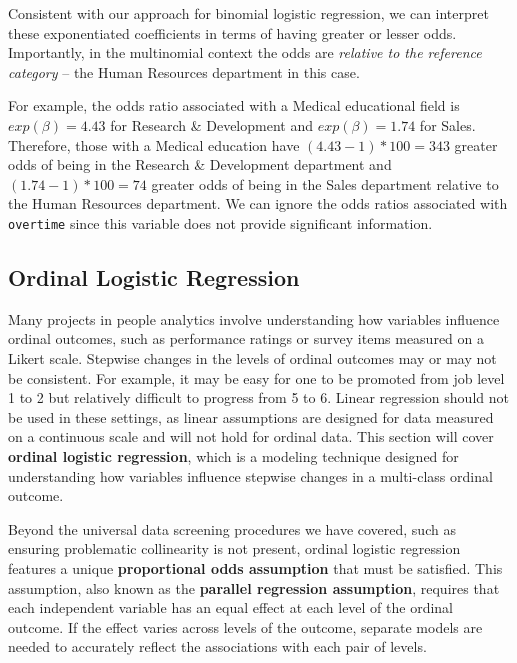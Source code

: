 \documentclass[
]{book}
\begin{document}
Consistent with our approach for binomial logistic regression, we can interpret these exponentiated coefficients in terms of having greater or lesser odds. Importantly, in the multinomial context the odds are \emph{relative to the reference category} -- the Human Resources department in this case.

For example, the odds ratio associated with a Medical educational field is \(exp(\beta) = 4.43\) for Research \& Development and \(exp(\beta) = 1.74\) for Sales. Therefore, those with a Medical education have \((4.43 - 1) * 100 = 343%
\) greater odds of being in the Research \& Development department and \((1.74 - 1) * 100 = 74%
\) greater odds of being in the Sales department relative to the Human Resources department. We can ignore the odds ratios associated with \texttt{overtime} since this variable does not provide significant information.

\hypertarget{ordinal-logistic-regression}{%
\subsection{Ordinal Logistic Regression}\label{ordinal-logistic-regression}}

Many projects in people analytics involve understanding how variables influence ordinal outcomes, such as performance ratings or survey items measured on a Likert scale. Stepwise changes in the levels of ordinal outcomes may or may not be consistent. For example, it may be easy for one to be promoted from job level 1 to 2 but relatively difficult to progress from 5 to 6. Linear regression should not be used in these settings, as linear assumptions are designed for data measured on a continuous scale and will not hold for ordinal data. This section will cover \textbf{ordinal logistic regression}, which is a modeling technique designed for understanding how variables influence stepwise changes in a multi-class ordinal outcome.

Beyond the universal data screening procedures we have covered, such as ensuring problematic collinearity is not present, ordinal logistic regression features a unique \textbf{proportional odds assumption} that must be satisfied. This assumption, also known as the \textbf{parallel regression assumption}, requires that each independent variable has an equal effect at each level of the ordinal outcome. If the effect varies across levels of the outcome, separate models are needed to accurately reflect the associations with each pair of levels.
\end{document}
